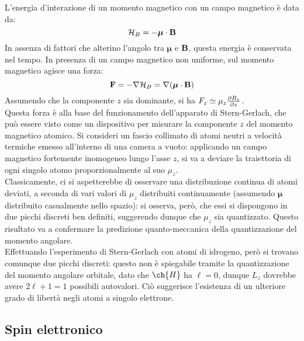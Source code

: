 L'energia d'interazione di un momento magnetico con un campo magnetico è data da:
\begin{equation}
	\mathcal{H}_B = - \boldsymbol{\mu} \cdot \mathbf{B}
	\label{eq:1.10}
\end{equation}
In assenza di fattori che alterino l'angolo tra $ \boldsymbol{\mu} $ e $ \mathbf{B} $, questa energia è conservata nel tempo. In presenza di un campo magnetico non uniforme, sul momento magnetico agisce una forza:
\begin{equation*}
	\mathbf{F} = - \nabla \mathcal{H}_B = \nabla (\boldsymbol{\mu} \cdot \mathbf{B})
\end{equation*}
Assumendo che la componente $ z $ sia dominante, si ha $ F_z \simeq \mu_z \frac{\partial B_z}{\partial z} $.\\
Questa forza è alla base del funzionamento dell'apparato di Stern-Gerlach, che può essere visto come un dispositivo per misurare la componente $ z $ del momento magnetico atomico. Si consideri un fascio collimato di atomi neutri a velocità termiche emesso all'interno di una camera a vuoto: applicando un campo magnetico fortemente inomogeneo lungo l'asse $ z $, si va a deviare la traiettoria di ogni singolo atomo proporzionalmente al suo $ \mu_z $.\\
Classicamente, ci si aspetterebbe di osservare una distribuzione continua di atomi deviati, a seconda di vari valori di $ \mu_z $ distribuiti continuamente (assumendo $ \boldsymbol{\mu} $ distribuito casualmente nello spazio): si osserva, però, che essi si dispongono in due picchi discreti ben definiti, suggerendo dunque che $ \mu_z $ sia quantizzato. Questo risultato va a confermare la predizione quanto-meccanica della quantizzazione del momento angolare.\\
Effettuando l'esperimento di Stern-Gerlach con atomi di idrogeno, però si trovano comunque due picchi discreti: questo non è spiegabile tramite la quantizzazione del momento angolare orbitale, dato che $ \ch{H} $ ha $ \ell = 0 $, dunque $ L_z $ dovrebbe avere $ 2\ell + 1 = 1 $ possibili autovalori. Ciò suggerisce l'esistenza di un ulteriore grado di libertà negli atomi a singolo elettrone.

\subsection{Spin elettronico}

